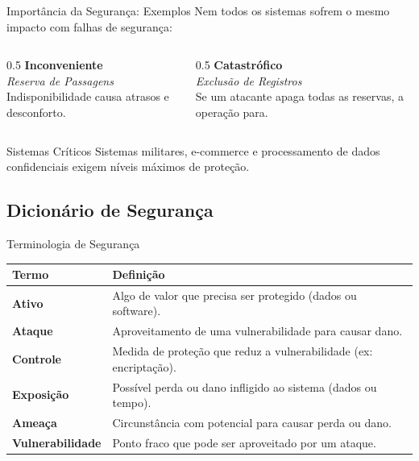 \documentclass[aspectratio=169]{beamer}
\begin{document}
\begin{frame}{Importância da Segurança: Exemplos}
    Nem todos os sistemas sofrem o mesmo impacto com falhas de segurança:
    \begin{columns}
        \begin{column}{0.5\textwidth}
            \centering
            \textbf{Inconveniente}\\
            \vspace{0.3cm}
            \textit{Reserva de Passagens}\\
            Indisponibilidade causa atrasos e desconforto.
        \end{column}
        \begin{column}{0.5\textwidth}
            \centering
            \textbf{Catastrófico}\\
            \vspace{0.3cm}
            \textit{Exclusão de Registros}\\
            Se um atacante apaga todas as reservas, a operação para.
        \end{column}
    \end{columns}
    \vspace{0.5cm}
    \begin{exampleblock}{Sistemas Críticos}
        Sistemas militares, e-commerce e processamento de dados confidenciais exigem níveis máximos de proteção.
    \end{exampleblock}
\end{frame}

\subsection{Dicionário de Segurança}
\begin{frame}{Terminologia de Segurança}
    \centering
    \scriptsize
    \begin{tabular}{lp{8cm}}
        \hline
        \textbf{Termo} & \textbf{Definição} \\
        \hline
        \textbf{Ativo} & Algo de valor que precisa ser protegido (dados ou software). \\
        \textbf{Ataque} & Aproveitamento de uma vulnerabilidade para causar dano. \\
        \textbf{Controle} & Medida de proteção que reduz a vulnerabilidade (ex: encriptação). \\
        \textbf{Exposição} & Possível perda ou dano infligido ao sistema (dados ou tempo). \\
        \textbf{Ameaça} & Circunstância com potencial para causar perda ou dano. \\
        \textbf{Vulnerabilidade} & Ponto fraco que pode ser aproveitado por um ataque. \\
        \hline
    \end{tabular}
\end{frame}
\end{document}
